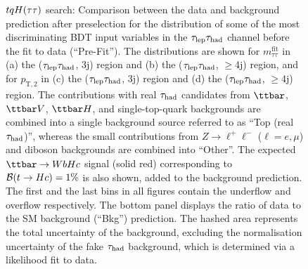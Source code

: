 \begin{figure}[t]
\begin{center}
\caption{$tqH(\tau\tau)$ search: Comparison between the data and background prediction after preselection for the distribution of some of the most
discriminating BDT input variables in the $\tau_{\mathrm{lep}} \tau_{\mathrm{had}}$ channel before the fit to data (``Pre-Fit''). The distributions are shown for
$m_{\tau\tau}^{\text{fit}}$ in (a) the ($\tau_{\mathrm{lep}} \tau_{\mathrm{had}}$, 3j) region and (b) the ($\tau_{\mathrm{lep}} \tau_{\mathrm{had}}$, $\geq$4j) region, and for
$p_{\text{T},2}$ in (c) the ($\tau_{\mathrm{lep}} \tau_{\mathrm{had}}$, 3j)  region and (d) the ($\tau_{\mathrm{lep}} \tau_{\mathrm{had}}$, $\geq$4j) region.
The contributions with real $\tau_{\mathrm{had}}$ candidates from $\ttbar$,  $\ttbar V$, $\ttbar H$, and single-top-quark backgrounds are combined into
a single background source referred to as ``Top (real $\tau_{\mathrm{had}}$)'', whereas the small contributions from 
$Z\to \ell^+\ell^-$ ($\ell = e, \mu$) and diboson backgrounds are combined into ``Other''. 
The expected $\Hc$ signal (solid red) corresponding to $\mathcal{B}(t\to Hc)=1\%$ is also shown,
added to the background prediction.
The first and the last bins in all figures contain the underflow and overflow respectively.
The bottom panel displays the ratio of data to the SM background (``Bkg'') prediction.
The hashed area represents the total uncertainty of the background, excluding the normalisation uncertainty of the fake $\tau_{\mathrm{had}}$ background, 
which is determined via a likelihood fit to data.}
\label{fig:BDT_inputs_lephad}
\end{center}
\end{figure}

